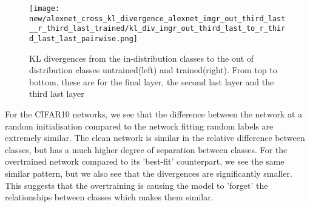 \documentclass{article}
\begin{document}
\begin{figure}[H]
\begin{minipage}{0.45\textwidth}
                \end{minipage}\hfill
                \begin{minipage}{0.45\textwidth}
                    \centering
                    \texttt{[image: new/alexnet\_cross\_kl\_divergence\_alexnet\_imgr\_out\_third\_last\_\_r\_third\_last\_trained/kl\_div\_imgr\_out\_third\_last\_to\_r\_third\_last\_last\_pairwise.png]}
                \end{minipage}
                \caption{KL divergences from the in-distribution classes to the out of distribution classes untrained(left) and trained(right). From top to bottom, these are for the final layer, the second last layer and the third last layer}
                \label{fig:cross_kl_divergence_a_to_b}
            
            \end{figure}
            
            For the CIFAR10 networks, we see that the difference between the network at a random initialisation compared to the network fitting random labels are extremely similar. The clean network is similar in the relative difference between classes, but has a much higher degree of separation between classes. For the overtrained network compared to its 'best-fit' counterpart, we see the same similar pattern, but we also see that the divergences are significantly smaller. This suggests that the overtraining is causing the model to 'forget' the relationships between classes which makes them similar. 
            
\end{document}
